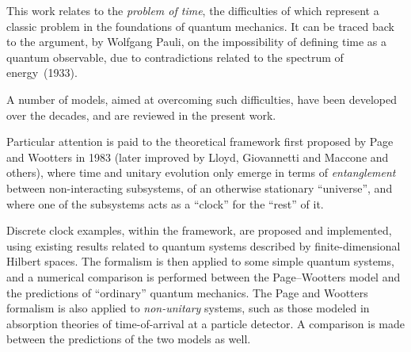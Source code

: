 This work relates to the
\emph{problem of time},
the difficulties of which
represent a classic problem in the foundations of quantum mechanics.
It can be traced back to
the argument, by Wolfgang Pauli,
on the impossibility of defining time as a quantum observable,
due to contradictions related to the spectrum of energy~(1933).

A number of models, aimed at overcoming such difficulties,
have been developed over the decades,
and are reviewed in the present work.

Particular attention is paid to 
the theoretical framework first proposed by Page and Wootters in 1983
(later improved by Lloyd, Giovannetti and Maccone and others),
where time and unitary evolution only emerge in
terms of \emph{entanglement} between non-interacting subsystems,
of an otherwise stationary ``universe'',
and where one of the subsystems acts as a ``clock'' for the ``rest'' of it.

{Discrete} clock examples, within the framework, are proposed and implemented,
using
existing results related to quantum systems described by finite-dimensional Hilbert spaces.
The formalism is then applied to some simple quantum systems,
and a numerical comparison is performed between the Page--Wootters model and the predictions
of ``ordinary'' quantum mechanics.
The Page and Wootters formalism is also applied to \emph{non-unitary} systems,
such as those modeled in absorption theories of time-of-arrival at a particle detector.
A comparison is made between the predictions of the two models as well.
